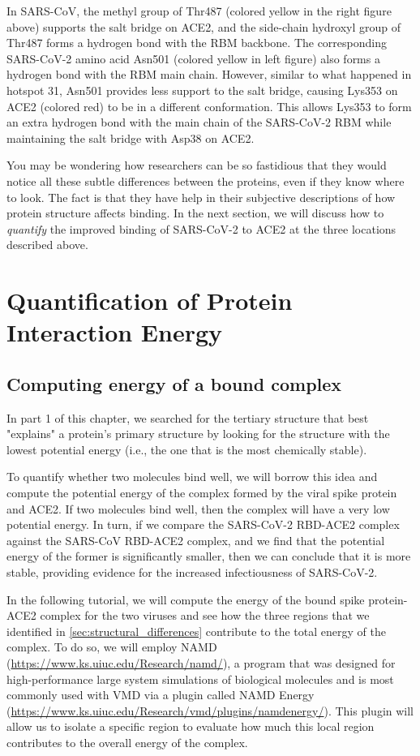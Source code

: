 {{In SARS-CoV, the methyl group of Thr487 (colored yellow in the right figure above) supports the salt bridge on ACE2, and the side-chain hydroxyl group of Thr487 forms a hydrogen bond with the RBM backbone. The corresponding SARS-CoV-2 amino acid Asn501 (colored yellow in left figure) also forms a hydrogen bond with the RBM main chain. However, similar to what happened in hotspot 31, Asn501 provides less support to the salt bridge, causing Lys353 on ACE2 (colored red) to be in a different conformation. This allows Lys353 to form an extra hydrogen bond with the main chain of the SARS-CoV-2 RBM while maintaining the salt bridge with Asp38 on ACE2.

You may be wondering how researchers can be so fastidious that they would notice all these subtle differences between the proteins, even if they know where to look. The fact is that they have help in their subjective descriptions of how protein structure affects binding. In the next section, we will discuss how to \textit{quantify} the improved binding of SARS-CoV-2 to ACE2 at the three locations described above.

\FloatBarrier
{}

\section{Quantification of Protein Interaction Energy}
\label{sec:interaction_energy}
\subsection{Computing energy of a bound complex}

In part 1 of this chapter, we searched for the tertiary structure that best "explains" a protein's primary structure by looking for the structure with the lowest potential energy (i.e., the one that is the most chemically stable).

To quantify whether two molecules bind well, we will borrow this idea and compute the potential energy of the complex formed by the viral spike protein and ACE2. If two molecules bind well, then the complex will have a very low potential energy. In turn, if we compare the SARS-CoV-2 RBD-ACE2 complex against the SARS-CoV RBD-ACE2 complex, and we find that the potential energy of the former is significantly smaller, then we can conclude that it is more stable, providing evidence for the increased infectiousness of SARS-CoV-2.

In the following tutorial, we will compute the energy of the bound spike protein-ACE2 complex for the two viruses and see how the three regions that we identified in \autoref{sec:structural_differences} contribute to the total energy of the complex. To do so, we will employ NAMD (\url{https://www.ks.uiuc.edu/Research/namd/}), a program that was designed for high-performance large system simulations of biological molecules and is most commonly used with VMD via a plugin called NAMD Energy (\url{https://www.ks.uiuc.edu/Research/vmd/plugins/namdenergy/}). This plugin will allow us to isolate a specific region to evaluate how much this local region contributes to the overall energy of the complex. 

}}
